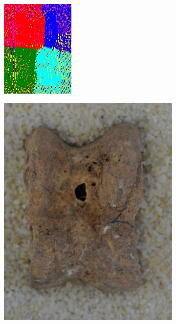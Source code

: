 \documentclass[pdftex,12pt,a4paper]{report}
\begin{document}
\begin{figure}[h]
\begin{subfigure}[b]{0.24\textwidth}
		\includegraphics[width=.9\linewidth]{img/segmentation/good/gabor/segmented.jpg}
		\subcaption*{}
		\label{}
	\end{subfigure}
	\begin{subfigure}[b]{0.24\textwidth}
		\centering
		\includegraphics[width=.9\linewidth]{img/segmentation/bad/gabor/cut.jpg}

\end{subfigure}
\end{figure}
\end{document}
